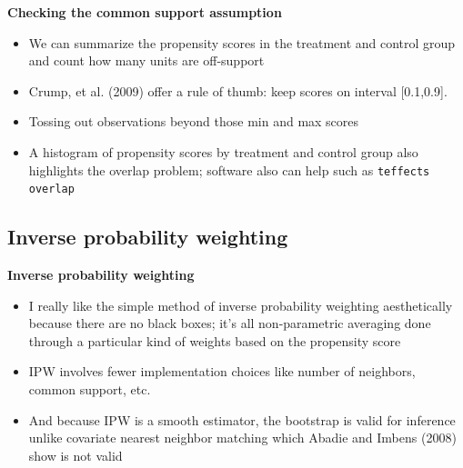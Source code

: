 \documentclass[notes=show]{beamer}
\begin{document}
\begin{frame}[plain]

	\begin{center}
	\textbf{Checking the common support assumption}
	\end{center}
	
	\begin{itemize}
	\item We can summarize the propensity scores in the treatment and control group and count how many units are off-support
	\item Crump, et al. (2009) offer a rule of thumb: keep scores on interval [0.1,0.9]. 
	\item Tossing out observations beyond those min and max scores
	\item A histogram of propensity scores by treatment and control group also highlights the overlap problem; software also can help such as \texttt{teffects overlap}
	\end{itemize}
	
\end{frame}



\subsection{Inverse probability weighting}

\begin{frame}
\begin{center}
\textbf{Inverse probability weighting}
\end{center}

\begin{itemize}
	\item I really like the simple method of inverse probability weighting aesthetically because there are no black boxes; it's all non-parametric averaging done through a particular kind of weights based on the propensity score
	\item IPW involves fewer implementation choices like number of neighbors, common support, etc.
	\item And because IPW is a smooth estimator, the bootstrap is valid for inference unlike covariate nearest neighbor matching which Abadie and Imbens (2008) show is not valid
\end{itemize}

\end{frame}
\end{document}
